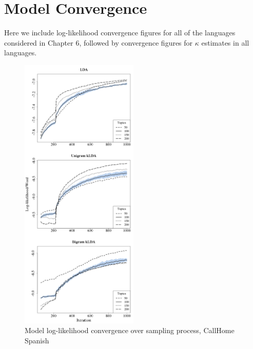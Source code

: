 \newpage
\chapter{Model Convergence} 

Here we include log-likelihood convergence figures for all of the languages considered in Chapter 6, followed by convergence figures for $\kappa$ estimates in all languages.


\label{sec:llconverge}


\begin{figure}[t]
\begin{center}
\includegraphics[width=0.5\textwidth]{graphs/ch6/ll/chsp-lda-ll.png}
\end{center}
\caption[Log-Likelihood convergence, CallHome Spanish]{Model log-likelihood convergence over sampling process, CallHome Spanish\label{figC:llCHSP}}
\end{figure}


